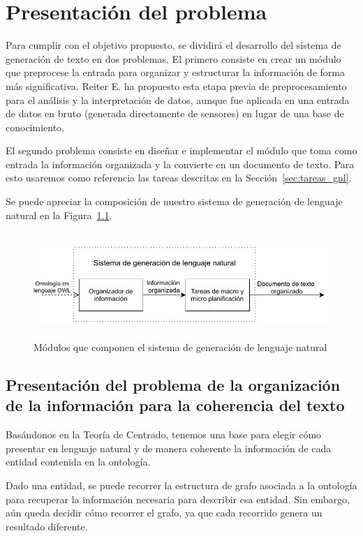 \chapter{Presentación del problema}

Para cumplir con el objetivo propuesto, se dividirá el desarrollo del sistema de generación de texto en dos problemas. El primero consiste en crear un módulo que preprocese la entrada para organizar y estructurar la información de forma más significativa. Reiter E. ha propuesto esta etapa previa de preprocesamiento~\cite{reiter2007architecture} para el análisis y la interpretación de datos, aunque fue aplicada en una entrada de datos en bruto (generada directamente de sensores) en lugar de una base de conocimiento.

El segundo problema consiste en diseñar e implementar el módulo que toma como entrada la información organizada y la convierte en un documento de texto. Para esto usaremos como referencia las tareas descritas en la Sección~\ref{sec:tareas_gnl}.

Se puede apreciar la composición de nuestro sistema de generación de lenguaje natural en la Figura~\ref{fig:modulos_sgln}.

\begin{figure}
    \centering
    \includegraphics[width=12cm, height=4cm]{img/presentacion_problema/modulos_sgln.pdf}
    \caption{Módulos que componen el sistema de generación de lenguaje natural}
    \label{fig:modulos_sgln}
\end{figure}

\section{Presentación del problema de la organización de la información para la coherencia del texto}
\label{sec:problema_coherencia-texto}

Basándonos en la Teoría de Centrado, tenemos una base para elegir cómo presentar en lenguaje natural y de manera coherente la información de cada entidad contenida en la ontología. 

Dado una entidad, se puede recorrer la estructura de grafo asociada a la ontología para recuperar la información necesaria para describir esa entidad. Sin embargo, aún queda decidir cómo recorrer el grafo, ya que cada recorrido genera un resultado diferente. 

